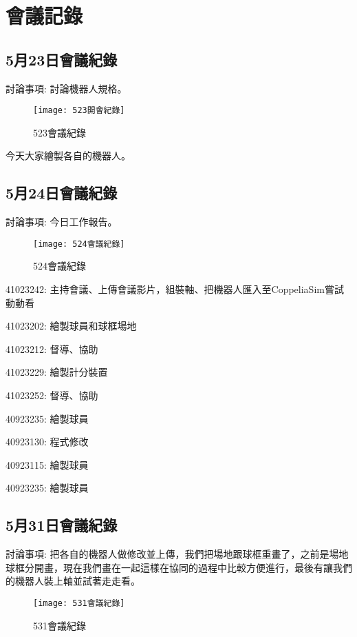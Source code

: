 \chapter{會議記錄}
\section{5月23日會議紀錄}
討論事項: 討論機器人規格。\\[6pt]
\begin{figure}[hbt!]
\begin{center}
\label{523會議紀錄}
\texttt{[image: 523開會紀錄]}
\caption{\Large 523會議紀錄}
\end{center}
\end{figure}
今天大家繪製各自的機器人。\\

\section{5月24日會議紀錄}
討論事項: 今日工作報告。\\

\begin{figure}[hbt!]
\begin{center}
\label{524會議紀錄}
\texttt{[image: 524會議紀錄]}
\caption{\Large 524會議紀錄}
\end{center}
\end{figure}

41023242: 主持會議、上傳會議影片，組裝軸、把機器人匯入至CoppeliaSim嘗試動動看\

41023202: 繪製球員和球框場地\

41023212: 督導、協助\

41023229: 繪製計分裝置\

41023252: 督導、協助\

40923235: 繪製球員\

40923130: 程式修改\

40923115: 繪製球員\

40923235: 繪製球員\

\section{5月31日會議紀錄}
討論事項: 把各自的機器人做修改並上傳，我們把場地跟球框重畫了，之前是場地球框分開畫，現在我們畫在一起這樣在協同的過程中比較方便進行，最後有讓我們的機器人裝上軸並試著走走看。\\

\begin{figure}[hbt!]
\begin{center}
\label{531會議紀錄}
\texttt{[image: 531會議紀錄]}
\caption{\Large 531會議紀錄}
\end{center}
\end{figure}

\newpage
